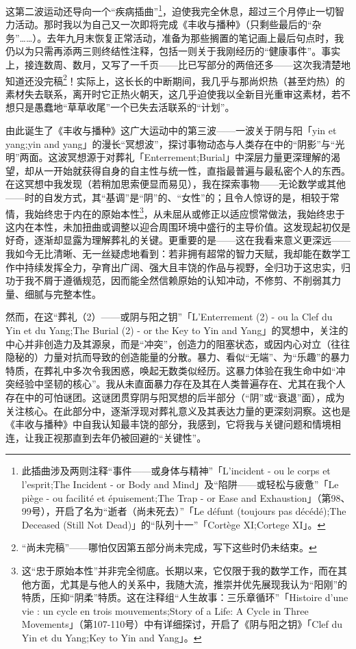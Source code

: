 这第二波运动还导向一个“疾病插曲”\footnote{此插曲涉及两则注释“事件——或身体与精神”「L'incident - ou le corps et l'esprit;The Incident - or Body and Mind」及“陷阱——或轻松与疲惫”「Le piège - ou facilité et épuisement;The Trap - or Ease and Exhaustion」（第98、99号），开启了名为“逝者（尚未死去）”「Le défunt (toujours pas décédé);The Deceased (Still Not Dead)」的“队列十一”「Cortège XI;Cortege XI」。}，迫使我完全休息，超过三个月停止一切智力活动。那时我以为自己又一次即将完成《丰收与播种》（只剩些最后的“杂务”……）。去年九月末恢复正常活动，准备为那些搁置的笔记画上最后句点时，我仍以为只需再添两三则终结性注释，包括一则关于我刚经历的“健康事件”。事实上，接连数周、数月，又写了一千页——比已写部分的两倍还多——这次我清楚地知道还没完稿\footnote{“尚未完稿”——哪怕仅因第五部分尚未完成，写下这些时仍未结束。}！实际上，这长长的中断期间，我几乎与那尚炽热（甚至灼热）的素材失去联系，离开时它正热火朝天，这几乎迫使我以全新目光重审这素材，若不想只是愚蠢地“草草收尾”一个已失去活联系的“计划”。

由此诞生了《丰收与播种》这广大运动中的第三波——一波关于阴与阳「yin et yang;yin and yang」的漫长“冥想波”，探讨事物动态与人类存在中的“阴影”与“光明”两面。这波冥想源于对葬礼「Enterrement;Burial」中深层力量更深理解的渴望，却从一开始就获得自身的自主性与统一性，直指最普遍与最私密个人的东西。在这冥想中我发现（若稍加思索便显而易见），我在探索事物——无论数学或其他——时的自发方式，其“基调”是“阴”的、“女性”的；且令人惊讶的是，相较于常情，我始终忠于内在的原始本性\footnote{这“忠于原始本性”并非完全彻底。长期以来，它仅限于我的数学工作，而在其他方面，尤其是与他人的关系中，我随大流，推崇并优先展现我认为“阳刚”的特质，压抑“阴柔”特质。这在注释组“人生故事：三乐章循环”「Histoire d'une vie : un cycle en trois mouvements;Story of a Life: A Cycle in Three Movements」（第107-110号）中有详细探讨，开启了《阴与阳之钥》「Clef du Yin et du Yang;Key to Yin and Yang」。}，从未屈从或修正以适应惯常做法，我始终忠于这内在本性，未加扭曲或调整以迎合周围环境中盛行的主导价值。这发现起初仅是好奇，逐渐却显露为理解葬礼的关键。更重要的是——这在我看来意义更深远——我如今无比清晰、无一丝疑虑地看到：若非拥有超常的智力天赋，我却能在数学工作中持续发挥全力，孕育出广阔、强大且丰饶的作品与视野，全归功于这忠实，归功于我不屑于遵循规范，因而能全然信赖原始的认知冲动，不修剪、不削弱其力量、细腻与完整本性。

然而，在这“葬礼（2）——或阴与阳之钥”「L'Enterrement (2) - ou la Clef du Yin et du Yang;The Burial (2) - or the Key to Yin and Yang」的冥想中，关注的中心并非创造力及其源泉，而是“冲突”，创造力的阻塞状态，或因内心对立（往往隐秘的）力量对抗而导致的创造能量的分散。暴力、看似“无端”、为“乐趣”的暴力特质，在葬礼中多次令我困惑，唤起无数类似经历。这暴力体验在我生命中如“冲突经验中坚韧的核心”。我从未直面暴力存在及其在人类普遍存在、尤其在我个人存在中的可怕谜团。这谜团贯穿阴与阳冥想的后半部分（“阴”或“衰退”面），成为关注核心。在此部分中，逐渐浮现对葬礼意义及其表达力量的更深刻洞察。这也是《丰收与播种》中自我认知最丰饶的部分，我感到，它将我与关键问题和情境相连，让我正视那直到去年仍被回避的“关键性”。

